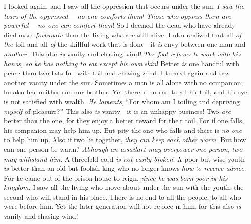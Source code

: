 \begin{biblechapter} %
 I looked again, and I saw all the oppression that occurs under the sun.
\verse \textit{I saw the tears of the oppressed— 
no one comforts them! 
Those who oppress them are powerful— 
no one can comfort them}!
\verse So I deemed the dead who have already died 
more \textit{fortunate} than the living who are still alive.
 I also realized that all \textit{of the} toil and all \textit{of} the skillful work that is done—it \textit{is} envy between one man and \textit{another}. This also \textit{is} vanity and chasing wind!
\verse \textit{The fool refuses to work with his hands, 
so he has nothing to eat except his own skin}!
\verse Better \textit{is} one handful with peace 
than two fists full with toil and chasing wind.
 I turned again and saw another vanity under the sun.
\verse Sometimes a man is all alone with no companion; he also has neither son nor brother. Yet there is no end to all his toil, and his eye is not satisfied with wealth. \textit{He laments,} “For whom am I toiling and depriving \textit{myself} of pleasure?” This also \textit{is} vanity—it is an unhappy business!
 Two \textit{are} better than the one, for they enjoy a better reward for their toil.
\verse For if one falls, his companion may help him up. But pity the one who falls and there is \textit{no one} to help him up.
\verse Also if two lie together, \textit{they can keep each other warm}. But how can one person be warm?
\verse \textit{Although an assailant may overpower one person, two may withstand him}. A threefold cord \textit{is not easily broken}!
 A poor but wise youth \textit{is} better than an old but foolish king who no longer knows \textit{how to receive advice}.
\verse For he came out of the prison house to reign, \textit{since he was born poor in his kingdom}.
\verse I saw all the living who move about under the sun with the youth; the second who will stand in his place.
\verse There is no end to all the people, to all who were before him. Yet the later generation will not rejoice in him, for this also \textit{is} vanity and chasing wind!
\end{biblechapter}

